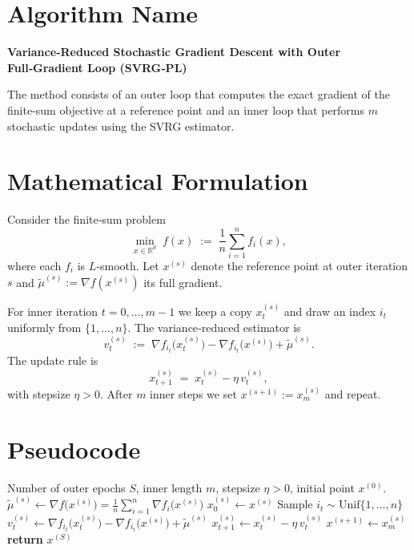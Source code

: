 \documentclass{article}
\begin{document}
\section*{Algorithm Name}
\textbf{Variance‑Reduced Stochastic Gradient Descent with Outer Full‑Gradient Loop (SVRG‑PL)}  

The method consists of an outer loop that computes the exact gradient of the finite‑sum objective at a reference point and an inner loop that performs $m$ stochastic updates using the SVRG estimator.

\section*{Mathematical Formulation}
Consider the finite‑sum problem
\[
\min_{x\in\mathbb{R}^d}\; f(x)\;:=\;\frac{1}{n}\sum_{i=1}^{n} f_i(x),
\]
where each $f_i$ is $L$‑smooth.  
Let $x^{(s)}$ denote the reference point at outer iteration $s$ and $\tilde{\mu}^{(s)}:=\nabla f(x^{(s)})$ its full gradient.  

For inner iteration $t=0,\dots,m-1$ we keep a copy $x_t^{(s)}$ and draw an index $i_t$ uniformly from $\{1,\dots,n\}$.  
The variance‑reduced estimator is
\[
v_t^{(s)} \;:=\; \nabla f_{i_t}\!\bigl(x_t^{(s)}\bigr)-\nabla f_{i_t}\!\bigl(x^{(s)}\bigr)+\tilde{\mu}^{(s)} .
\]
The update rule is
\[
x_{t+1}^{(s)} \;=\; x_t^{(s)} - \eta\, v_t^{(s)} ,
\]
with stepsize $\eta>0$.  
After $m$ inner steps we set $x^{(s+1)}:=x_m^{(s)}$ and repeat.

\section*{Pseudocode}
\begin{algorithm}[H]
\caption{SVRG‑PL}
\begin{algorithmic}[1]
\Require Number of outer epochs $S$, inner length $m$, stepsize $\eta>0$, initial point $x^{(0)}$.
    \State $\tilde{\mu}^{(s)}\gets \nabla f\bigl(x^{(s)}\bigr)=\frac{1}{n}\sum_{i=1}^{n}\nabla f_i\bigl(x^{(s)}\bigr)$ 
    \State $x_0^{(s)}\gets x^{(s)}$
        \State Sample $i_t\sim \text{Unif}\{1,\dots,n\}$
        \State $v_t^{(s)}\gets \nabla f_{i_t}\!\bigl(x_t^{(s)}\bigr)-\nabla f_{i_t}\!\bigl(x^{(s)}\bigr)+\tilde{\mu}^{(s)}$
        \State $x_{t+1}^{(s)}\gets x_t^{(s)}-\eta\, v_t^{(s)}$
    \EndFor
    \State $x^{(s+1)}\gets x_m^{(s)}$
\EndFor
\State \textbf{return} $x^{(S)}$
\end{algorithmic}
\end{algorithm}
\end{document}
